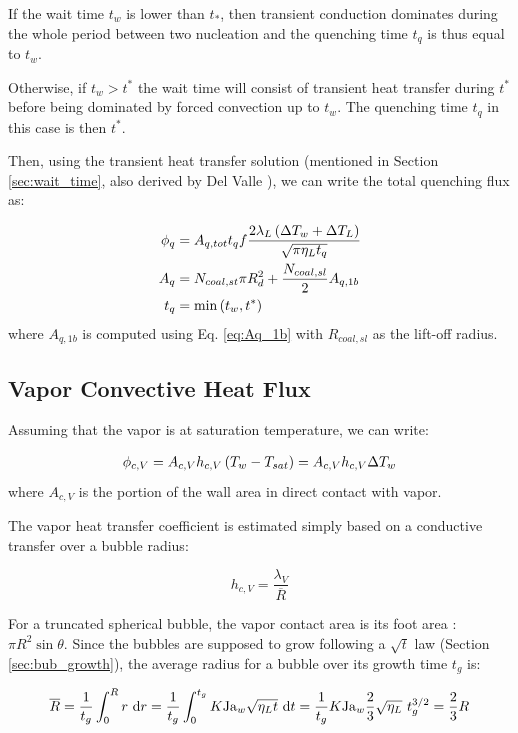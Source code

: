 If the wait time $t_{w}$ is lower than $t_{*}$, then transient conduction dominates during the whole period between two nucleation and the quenching time $t_{q}$ is thus equal to $t_{w}$.

Otherwise, if $t_{w}>t^{*}$ the wait time will consist of transient heat transfer during $t^{*}$ before being dominated by forced convection up to $t_{w}$. The quenching time $t_{q}$ in this case is then $t^{*}$.

Then, using the transient heat transfer solution (mentioned in Section \ref{sec:wait_time}, also derived by Del Valle \cite{delvalle_phd}), we can write the total quenching flux as:

\begin{align}
\phi_{q} &= A_{q,tot}t_{q}f \frac{2\lambda_{L}\left( \Delta T_{w} + \Delta T_{L} \right)}{\sqrt{\pi \eta_{L}t_{q}} }\\
A_{q} &= N_{coal,st} \pi R_{d}^{2} + \frac{N_{coal,sl}}{2} A_{q,1b} \\
t_{q} &= \mathrm{min}\left( t_{w}, t^{*} \right)
\end{align}
where $A_{q,1b}$ is computed using Eq. \ref{eq:Aq_1b} with $R_{coal,sl}$ as the lift-off radius.


\subsection{Vapor Convective Heat Flux}

Assuming that the vapor is at saturation temperature, we can write:

\begin{align}
\phi_{c,V} = A_{c,V} h_{c,V} \left( T_{w}-T_{sat} \right) = A_{c,V} h_{c,V} \Delta T_{w}
\end{align}
where $A_{c,V}$ is the portion of the wall area in direct contact with vapor.

\npar

The vapor heat transfer coefficient is estimated simply based on a conductive transfer over a bubble radius:

\begin{equation}
h_{c,V} = \dfrac{\lambda_{V}}{\overline{R}}
\end{equation}

For a truncated spherical bubble, the vapor contact area is its foot area : $\pi R^{2}\sin{\theta}$. Since the bubbles are supposed to grow following a $\sqrt{t}$ law (Section \ref{sec:bub_growth}), the average radius for a bubble over its growth time $t_{g}$ is:

\begin{equation}
\overline{R} = \frac{1}{t_{g}}\int_{0}^{R}r\ \mathrm{d}r = \frac{1}{t_{g}} \int_{0}^{t_{g}} K\mathrm{Ja}_{w}\sqrt{\eta_{L}t}~\mathrm{d}t = \frac{1}{t_{g}} K\mathrm{Ja}_{w} \frac{2}{3}\sqrt{\eta_{L}}~t_{g}^{3/2} = \frac{2}{3}R
\end{equation}

